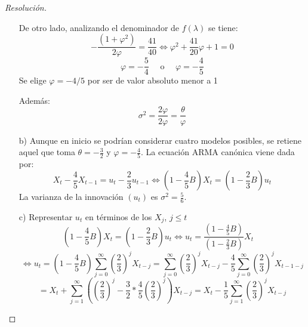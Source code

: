 \begin{ejemplo}
\begin{proof}[Resoluci\'{o}n]
\begin{enumerate}
De otro lado, analizando el denominador de $f(\lambda )$ se tiene:
\[
-\frac{\left( {1+\varphi^{2}} \right)}{2\varphi }=\frac{41}{40}\Longleftrightarrow \varphi^{2}+\frac{41}{20}\varphi +1=0
\]
\[
\varphi =-\frac{5}{4}\quad\text{ o }\quad\varphi =-\frac{4}{5}
\]
Se elige $\varphi = - 4/5$ por ser de valor absoluto menor a 1

Adem\'{a}s:
\[
\sigma^{2}=\frac{2\varphi }{2\varphi }=\frac{\theta }{\varphi }
\]

\item[b)] Aunque en inicio se podr\'{i}an considerar cuatro modelos posibles, se retiene aquel que toma $\theta =-\frac{3}{2}$ y $\varphi =-\frac{4}{5}$. La ecuaci\'{o}n ARMA can\'{o}nica viene dada por:
\[
X_{t} -\frac{4}{5}X_{t-1} =u_{t} -\frac{2}{3}u_{t-1} \Longleftrightarrow \left( 
{1-\frac{4}{5}B} \right)X_{t} =\left( {1-\frac{2}{3}B} \right)u_{t} 
\]
La varianza de la innovaci\'{o}n $(u_{{t}})$ es $\sigma^{2}=\frac{5}{6}$.

\item[c)] Representar $u_{{t}}$ en t\'{e}rminos de los $X_{j}$, $j\le  t$
\[
\left( {1-\frac{4}{5}B} \right)X_{t} =\left( {1-\frac{2}{3}B} \right)u_{t} \Longleftrightarrow u_{t} =\frac{\left( {1-\frac{4}{5}B} \right)}{\left( {1-\frac{2}{3}B} \right)}X_{t} 
\quad
\]
\[
\Longleftrightarrow u_{t} =\left( {1-\frac{4}{5}B} \right)\sum_{j=0}^\infty {\left( {\frac{2}{3}} \right)}^{j}X_{t-j} =\sum_{j=0}^\infty {\left( {\frac{2}{3}} \right)}^{j}X_{t-j} -\frac{4}{5}\sum_{j=0}^\infty {\left( {\frac{2}{3}} \right)}^{j}X_{t-1-j} 
\]
\[
=X_{t} +\sum_{j=1}^\infty {\left( {\left( {\frac{2}{3}} 
\right)^{j}-\frac{3}{2}\ast \frac{4}{5}\left( {\frac{2}{3}} \right)^{j}} \right)X_{t-j} } 
=X_{t} -\frac{1}{5}\sum_{j=1}^\infty {\left( {\frac{2}{3}} \right)} ^{j}X_{t-j} 
\]
\end{enumerate}
\end{proof}
\end{ejemplo}


